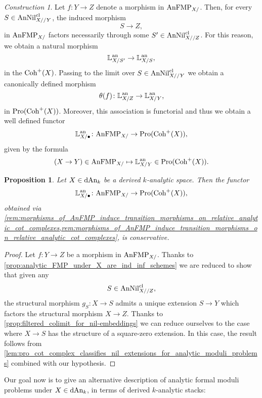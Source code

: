 \documentclass[10pt,a4paper,reqno]{amsart} %
\theoremstyle{plain}
\newtheorem{prop}[thm]{Proposition}
\theoremstyle{definition}
\theoremstyle{remark}
\numberwithin{equation}{section}
\newtheorem{construction}[thm]{Construction}
\begin{document}
\begin{construction} \label{rem:morphisms_of_AnFMP_induce_transition_morphisms_on_relative_analytic_cot_complexes}
    Let $f \colon Y \to Z$ denote a morphism in $\mathrm{AnFMP}_{X/}$. Then, for every $S \in \mathrm{AnNil}_{X/ /Y}^{\mathrm{cl}}$, the induced morphism
        \[
            S \to Z,   
        \]
    in $\mathrm{AnFMP}_{X/}$ factors necessarily through some $S' \in \mathrm{AnNil}^{\mathrm{cl}}_{X/ /Z}$. For this reason, we obtain a natural morphism
        \[
            \mathbb L^\mathrm{an}_{X/S'} \to \mathbb L^\mathrm{an}_{X/S},  
        \]
    in the \infcat $\mathrm{Coh}^+(X)$. Passing to the limit over $S \in \mathrm{AnNil}^{\mathrm{cl}}_{X//Y}$ we obtain a canonically defined morphism
        \[
            \theta (f) \colon \mathbb L^\mathrm{an}_{X/Z} \to \mathbb L^\mathrm{an}_{X/Y},  
        \]
    in $\mathrm{Pro}(\mathrm{Coh}^+(X))$. Moreover, this association is functorial and thus we obtain a well defined functor
        \[
            \mathbb L^\mathrm{an}_{X/ \bullet} \colon \mathrm{AnFMP}_{X/ } \to \mathrm{Pro}(\mathrm{Coh}^+(X)),  
        \]
    given by the formula
        \[
            (X \to Y) \in \mathrm{AnFMP}_{X/ } \mapsto \mathbb L^\mathrm{an}_{X/ Y} \in \mathrm{Pro}(\mathrm{Coh}^+(X)).  
        \]
\end{construction}

\begin{prop} \label{prop:conservativity_of_relative_an_cot_complex}
    Let $X \in \mathrm{dAn}_k$ be a derived $k$-analytic space. Then the functor
    \[
        \mathbb L^\mathrm{an}_{X/ \bullet} \colon \mathrm{AnFMP}_{X/} \to \mathrm{Pro}(\mathrm{Coh}^+(X)),
    \]
    obtained via \cref{rem:morphisms_of_AnFMP_induce_transition_morphisms_on_relative_analytic_cot_complexes,rem:morphisms_of_AnFMP_induce_transition_morphisms_on_relative_analytic_cot_complexes},
    is conservative.
\end{prop}

\begin{proof} Let $f \colon Y \to Z $ be a morphism in $\mathrm{AnFMP}_{X/}$.
    Thanks to \cref{prop:analytic_FMP_under_X_are_ind_inf_schemes} we are reduced to show that given any
        \[
            S \in \mathrm{AnNil}_{X//Z}^{\mathrm{cl}},  
        \]
    the structural morphism $g_S \colon X \to S$ admits a unique extension $S \to Y$ which factors the structural morphism $X \to Z$. Thanks to
    \cref{prop:filtered_colimit_for_nil-embeddings} we can reduce ourselves to the case where $X \to S$ has the structure of
    a square-zero extension. In this case, the result follows from \cref{lem:pro_cot_complex_classifies_nil_extensions_for_analytic_moduli_problems}
    combined with our hypothesis.
\end{proof}

Our goal now is to give an alternative description of analytic formal moduli problems under $X \in \mathrm{dAn}_k$, in terms of derived $k$-analytic stacks: 
\end{document}
